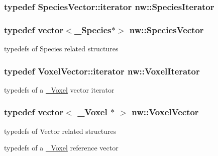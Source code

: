 \hypertarget{namespacenw_a28941aaaa0562445c168a620b63547d2}{
\subsubsection[{Species\+Iterator}]{\setlength{\rightskip}{0pt plus 5cm}typedef Species\+Vector\+::iterator {\bf nw\+::\+Species\+Iterator}}}\label{namespacenw_a28941aaaa0562445c168a620b63547d2}
\hypertarget{namespacenw_a68aa8285591d78ebfc793c531bd43a23}{
\subsubsection[{Species\+Vector}]{\setlength{\rightskip}{0pt plus 5cm}typedef vector$<${\bf \+\_\+\+Species}$\ast$$>$ {\bf nw\+::\+Species\+Vector}}}\label{namespacenw_a68aa8285591d78ebfc793c531bd43a23}


typedefs of Species related structures 

\hypertarget{namespacenw_a79f35b5a82b764c7144ecf3074e926c0}{
\subsubsection[{Voxel\+Iterator}]{\setlength{\rightskip}{0pt plus 5cm}typedef Voxel\+Vector\+::iterator {\bf nw\+::\+Voxel\+Iterator}}}\label{namespacenw_a79f35b5a82b764c7144ecf3074e926c0}


typedefs of a \hyperlink{classnw_1_1___voxel}{\+\_\+\+Voxel} vector iterator 

\hypertarget{namespacenw_ad7146b8b5a9de9be416847f41135722c}{
\subsubsection[{Voxel\+Vector}]{\setlength{\rightskip}{0pt plus 5cm}typedef vector$<$ {\bf \+\_\+\+Voxel} $\ast$ $>$ {\bf nw\+::\+Voxel\+Vector}}}\label{namespacenw_ad7146b8b5a9de9be416847f41135722c}


typedefs of Vector related structures 

typedefs of a \hyperlink{classnw_1_1___voxel}{\+\_\+\+Voxel} reference vector 

